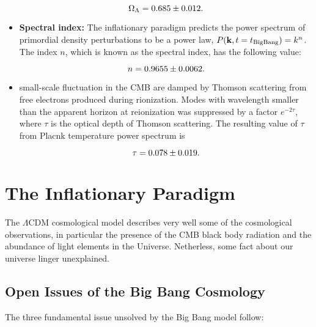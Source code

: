\begin{itemize}
        \begin{equation}
                \Omega_\Lambda = \num{0.685 \pm 0.012}.
        \end{equation}

        \item \textbf{Spectral index:} The inflationary paradigm predicts
        the power spectrum of primordial density perturbations to be a
        power law, $P\qty(\vb{k},t = t_\text{BigBang}) = k^n$. The index
        $n$, which is known as the spectral index, has the following value:

        \begin{equation}
                n = \num{0.9655 \pm 0.0062}.
        \end{equation}

        \item small-scale fluctuation in the CMB are damped by Thomson
        scattering from free electrons produced during rionization. Modes
        with wavelength smaller than the apparent horizon at reionization
        was suppressed by a factor $e^{-2\tau}$, where $\tau$ is the optical
        depth of Thomson scattering. The resulting value of $\tau$ from Placnk
        temperature power spectrum is 

        \begin{equation}
                \tau = \num{0.078 \pm 0.019}. 
        \end{equation}
\end{itemize}

\section{The Inflationary Paradigm}

The $\Lambda$CDM cosmological model describes very well some of the
cosmological observations, in particular the presence of the CMB black
body radiation and the abundance of light elements in the Universe.
Netherless, some fact about our universe linger unexplained.

\subsection{Open Issues of the Big Bang Cosmology}\label{ss:issues}

The three fundamental issue unsolved by the Big Bang model follow:

